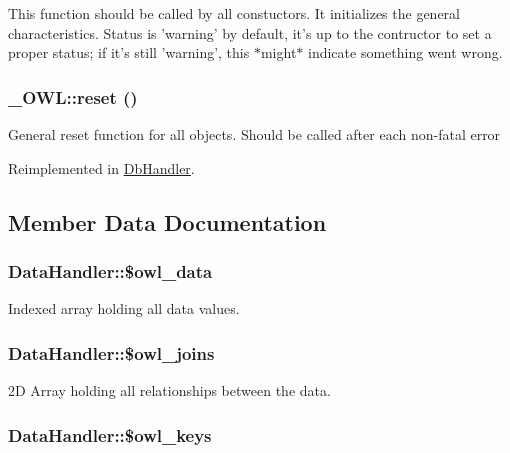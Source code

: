 This function should be called by all constuctors. It initializes the general characteristics. Status is 'warning' by default, it's up to the contructor to set a proper status; if it's still 'warning', this $\ast$might$\ast$ indicate something went wrong. \hypertarget{class__OWL_2f2a042bcf31965194c03033df0edc9b}{
\subsubsection{\setlength{\rightskip}{0pt plus 5cm}\_\-OWL::reset ()}}
\label{class__OWL_2f2a042bcf31965194c03033df0edc9b}


General reset function for all objects. Should be called after each non-fatal error 

Reimplemented in \hyperlink{classDbHandler_9982df4830f05803935bb31bac7fae3d}{DbHandler}.

\subsection{Member Data Documentation}
\hypertarget{classDataHandler_329b5524c379e0db6c4d5ce59f3c414f}{
\subsubsection{\setlength{\rightskip}{0pt plus 5cm}DataHandler::\$owl\_\-data}}
\label{classDataHandler_329b5524c379e0db6c4d5ce59f3c414f}


Indexed array holding all data values. \hypertarget{classDataHandler_da9b697f81ea82d269077f9c7445791d}{
\subsubsection{\setlength{\rightskip}{0pt plus 5cm}DataHandler::\$owl\_\-joins}}
\label{classDataHandler_da9b697f81ea82d269077f9c7445791d}


2D Array holding all relationships between the data. \hypertarget{classDataHandler_8d398720bce975159b2d13ad7a941bc7}{
\subsubsection{\setlength{\rightskip}{0pt plus 5cm}DataHandler::\$owl\_\-keys}}
\label{classDataHandler_8d398720bce975159b2d13ad7a941bc7}



